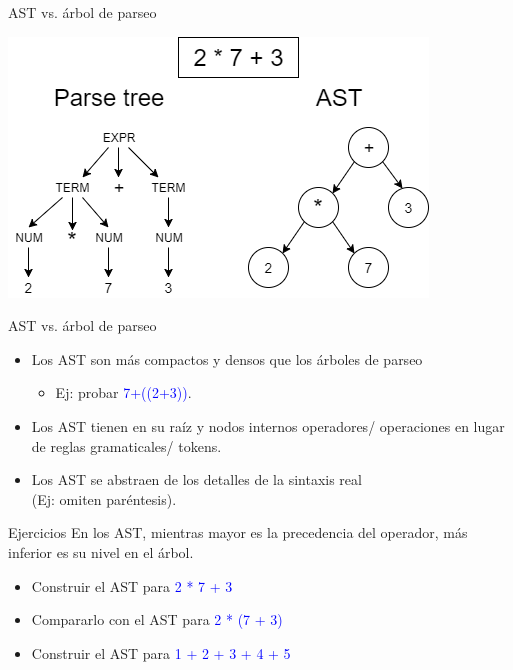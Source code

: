 \documentclass[handout]{beamer} %
\newcommand{\blue}[1]{\textcolor{blue}{#1}}
\begin{document}
\begin{frame}{AST vs. árbol de parseo}
    \begin{center}
    \includegraphics[width=\textwidth]{./image/cap3/AST_parse_tree}
    \end{center}
\end{frame}

\begin{frame}{AST vs. árbol de parseo}
    \begin{itemize}
        \item<1-> Los AST son más compactos y densos que los árboles de parseo
        \begin{itemize}
            \item Ej: probar \blue{7+((2+3))}.
        \end{itemize}
        \item<2-> Los AST tienen en su raíz y nodos internos operadores/ operaciones en lugar de reglas gramaticales/ tokens.
        \item<2-> Los AST se abstraen de los detalles de la sintaxis real\\(Ej: omiten paréntesis).
    \end{itemize}
\end{frame}

\begin{frame}{Ejercicios}
    En los AST, mientras mayor es la precedencia del operador, más inferior es su nivel en el árbol.
    \begin{itemize}
        \item<2-> Construir el AST para \blue{2 * 7 + 3}
        \item<3-> Compararlo con el AST para \blue{2 * (7 + 3)}
        \item<4-> Construir el AST para \blue{1 + 2 + 3 + 4 + 5}
    \end{itemize}
    \medskip
    
    \\
    \medskip
    
\end{frame}
\end{document}
